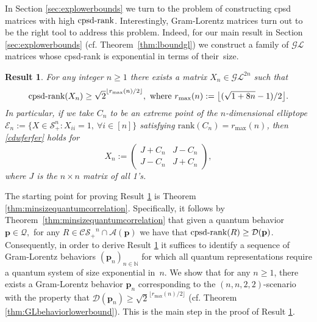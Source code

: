 \documentclass{siamart}
\newtheorem{thm}{Result}
\begin{document}
{{{In Section \ref{sec:explowerbounds} we turn to the problem of constructing  cpsd matrices with high ${\mathrm{cpsd}\textnormal{-rank}}$.
Interestingly,  Gram-Lorentz matrices turn out  to be the right tool  to address  this problem.
Indeed, {for our}  main result in    Section \ref{sec:explowerbounds} (cf. Theorem~\ref{thm:lboundgl}) we construct a family of ${\mathcal{GL}}$ matrices whose cpsd-rank is exponential in terms of their~size.

\medskip
\begin{thm}\label{res:first}
For  any {integer} $n\ge 1$ there  exists a matrix   $X_n\in {\mathcal{GL}}^{2n}$ such that
\begin{equation}\label{cdwferfer}
 {\mathrm{cpsd}\textnormal{-rank}}(X_n)\ge  {\sqrt{2}^{\lfloor {r_{\max}}(n)/ 2 \rfloor}}, \text{ where } {r_{\max}(n) := \left\lfloor {(\sqrt{1+8n}-1)/2}\right\rfloor}.
 \end{equation}
  In particular, if  we take  $C_n$  to be  an extreme point of the $n$-dimensional elliptope $ {\mathcal{E}}_n:=\{X\in {\mathcal{S}}^n_+: X_{ii}=1,\  \forall i\in [n]\}$ satisfying   ${\mathrm{rank}}(C_n)=r_{\max}(n)$, then \eqref{cdwferfer} {holds for}
$$
X_n:= \begin{pmatrix}J+C_n & J-C_n\\J-C_n& J+C_n\end{pmatrix},
$$
where $J$ is the $n\times n$ matrix of all 1's.
\end{thm}

The starting point for proving  Result \ref{res:first} is  Theorem \ref{thm:minsizequantumcorrelation}. Specifically, it follows
by Theorem~\ref{thm:minsizequantumcorrelation} that  given a quantum behavior ${\mathbf{p}} \in {\mathcal{Q}},$  for any $  R\in {\mathcal{CS}_+}^n\cap \mathcal{A}({\mathbf{p}})$ we have that ${\mathrm{cpsd}\textnormal{-rank}}(R)\ge\mathcal{D}({\mathbf{p}})$.
 Consequently, in order to derive   Result \ref{res:first}  it suffices to identify a sequence  of  Gram-Lorentz  behaviors $({\mathbf{p}}_n)_{n\in \mathbb{N}}$  for which  all quantum representations require a quantum system of size exponential in~$n$.
We show that  for  any $n\ge 1$, there exists a
Gram-Lorentz behavior ${\mathbf{p}}_n$ corresponding to the $(n,n,2,2)$-scenario with the property that  $\mathcal{D}({\mathbf{p}}_n)\ge  {\sqrt{2}^{\lfloor {r_{\max}}(n)/ 2 \rfloor}}$  (cf.   Theorem \ref{thm:GLbehaviorlowerbound}).  This is the {main step in} the proof of Result \ref{res:first}.

}}}
\end{document}
